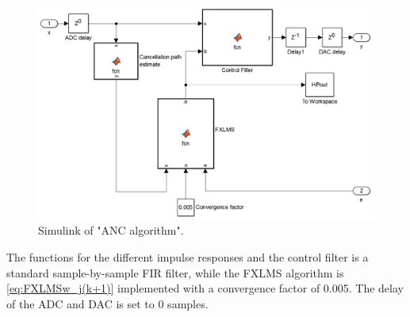 \begin{figure}[H]
	\centering
	\includegraphics[width=1\textwidth]{figures/BasicSystem/SimulinkANC}
	\caption{Simulink of "ANC algorithm".}
	\label{fig:SimulinkANC}
\end{figure} 

The functions for the different impulse responses and the control filter is a standard sample-by-sample FIR filter, while the FXLMS algorithm is \autoref{eq:FXLMSw_j(k+1)} implemented with a convergence factor of 0.005. The delay of the ADC and DAC is set to 0 samples.



